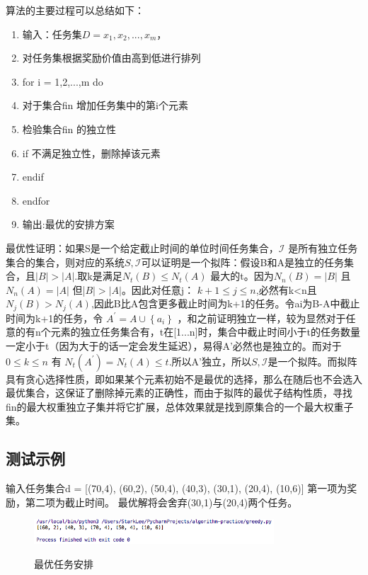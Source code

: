 \documentclass[UTF8]{ctexart}
\begin{document}
算法的主要过程可以总结如下：
\begin{enumerate}
	\item 输入：任务集$D={x_1,x_2,...,x_m}$，
  \item 对任务集根据奖励价值由高到低进行排列
	\item for i = 1,2,...,m do
	\item 对于集合fin 增加任务集中的第i个元素
	\item 检验集合fin 的独立性
	\item if 不满足独立性，删除掉该元素
	\item endif
	\item endfor
	\item 输出:最优的安排方案
\end{enumerate}

最优性证明：如果S是一个给定截止时间的单位时间任务集合，$\mathcal{I}$ 是所有独立任务集合的集合，则对应的系统$S,\mathcal{I}$可以证明是一个拟阵：假设B和A是独立的任务集合，且$|B|>|A|$.取k是满足$N_{t}(B) \leqslant N_{t}(A)$ 最大的t。因为$N_{n}(B)=|B|$ 且 $N_{n}(A)=|A|$ 但|$B|>|A|$。因此对任意j： $k+1 \leq j \leq n$,必然有k<n且$N_{j}(B)>N_{j}(A)$,因此B比A包含更多截止时间为k+1的任务。令ai为B-A中截止时间为k+1的任务，令
$A^{\prime}=A \cup\left\{a_{i}\right\}$
，和之前证明独立一样，较为显然对于任意的有n个元素的独立任务集合有，t在[1...n]时，集合中截止时间小于t的任务数量一定小于t（因为大于的话一定会发生延迟），易得A'必然也是独立的。而对于$0\leq k \leq n$ 有 $N_{t}\left(A^{\prime}\right)=N_{t}(A) \leqslant t$.所以A'独立，所以$S,\mathcal{I}$是一个拟阵。而拟阵具有贪心选择性质，即如果某个元素初始不是最优的选择，那么在随后也不会选入最优集合，这保证了删除掉元素的正确性，而由于拟阵的最优子结构性质，寻找fin的最大权重独立子集并将它扩展，总体效果就是找到原集合的一个最大权重子集。


\subsection{测试示例}
输入任务集合d = [(70,4), (60,2), (50,4), (40,3), (30,1), (20,4), (10,6)] 第一项为奖励，第二项为截止时间。
最优解将会舍弃(30,1)与(20,4)两个任务。

\begin{figure}[H]
  \centering
  \label{fig:Per6A}\includegraphics[width=0.8\textwidth]{result3.png}\
  \caption{最优任务安排}
  \label{fig:oscil}
\end{figure}
\end{document}
